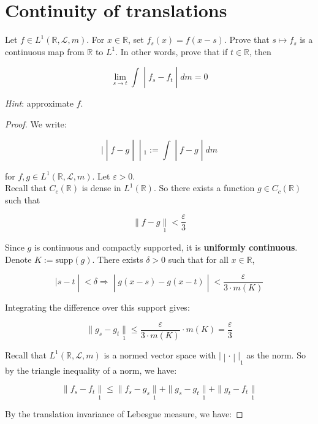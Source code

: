 \section{Continuity of translations}\label{continuity-of-translations}

Let \(f \in L^{1}(\mathbb{R},\mathcal{L},m)\). For \(x \in \mathbb{R}\), set \(f_{s}(x) = f(x - s)\). Prove that \(s\mapsto f_{s}\) is a continuous map from \(\mathbb{R}\) to \(L^{1}\). In other words, prove that if \(t \in \mathbb{R}\), then

\[\left. \lim\limits_{s\rightarrow t}\int \middle| f_{s} - f_{t} \middle| dm = 0 \right.\]

\emph{Hint}: approximate \(f\).

\begin{proof}

We write:

\[\left. | \middle| f - g \middle| \middle| {}_{1} := \int \middle| f - g \middle| dm \right.\]

for \(f,g \in L^{1}(\mathbb{R},\mathcal{L},m)\). Let \(\varepsilon > 0\).\\
Recall that \(C_{c}(\mathbb{R})\) is dense in \(L^{1}(\mathbb{R})\). So there exists a function \(g \in C_{c}(\mathbb{R})\) such that

\[\parallel f - g\underset{1}{\parallel} < \frac{\varepsilon}{3}\]

Since \(g\) is continuous and compactly supported, it is \textbf{uniformly continuous}. Denote \(K := \text{supp}(g)\). There exists \(\delta > 0\) such that for all \(x \in \mathbb{R}\),

\[\left. |s - t \middle| < \delta\Longrightarrow \middle| g(x - s) - g(x - t) \middle| < \frac{\varepsilon}{3 \cdot m(K)} \right.\]

Integrating the difference over this support gives:

\[\parallel g_{s} - g_{t}\underset{1}{\parallel} \leq \frac{\varepsilon}{3 \cdot m(K)} \cdot m(K) = \frac{\varepsilon}{3}\]

Recall that \(L^{1}(\mathbb{R},\mathcal{L},m)\) is a normed vector space with \(\left. | \middle| \cdot \middle| |_{1} \right.\) as the norm. So by the triangle inequality of a norm, we have:

\[\parallel f_{s} - f_{t}\underset{1}{\parallel} \leq \parallel f_{s} - g_{s}\underset{1}{\parallel} + \parallel g_{s} - g_{t}\underset{1}{\parallel} + \parallel g_{t} - f_{t}\underset{1}{\parallel}\]

By the translation invariance of Lebesgue measure, we have:


\end{proof}
